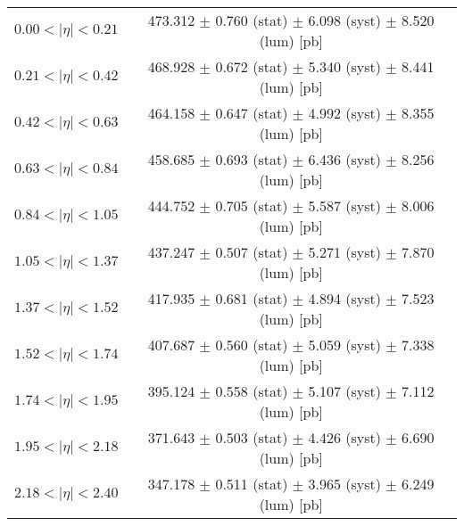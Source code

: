 \begin{tabular}{lc}
\hline
$0.00 < |\eta| <0.21$          & 473.312 $\pm$ 0.760 (stat) $\pm$ 6.098 (syst) $\pm$ 8.520 (lum) [pb]  \\
$0.21 < |\eta| <0.42$          & 468.928 $\pm$ 0.672 (stat) $\pm$ 5.340 (syst) $\pm$ 8.441 (lum) [pb]  \\
$0.42 < |\eta| <0.63$          & 464.158 $\pm$ 0.647 (stat) $\pm$ 4.992 (syst) $\pm$ 8.355 (lum) [pb]  \\
$0.63 < |\eta| <0.84$          & 458.685 $\pm$ 0.693 (stat) $\pm$ 6.436 (syst) $\pm$ 8.256 (lum) [pb]  \\
$0.84 < |\eta| <1.05$          & 444.752 $\pm$ 0.705 (stat) $\pm$ 5.587 (syst) $\pm$ 8.006 (lum) [pb]  \\
$1.05 < |\eta| <1.37$          & 437.247 $\pm$ 0.507 (stat) $\pm$ 5.271 (syst) $\pm$ 7.870 (lum) [pb]  \\
$1.37 < |\eta| <1.52$          & 417.935 $\pm$ 0.681 (stat) $\pm$ 4.894 (syst) $\pm$ 7.523 (lum) [pb]  \\
$1.52 < |\eta| <1.74$          & 407.687 $\pm$ 0.560 (stat) $\pm$ 5.059 (syst) $\pm$ 7.338 (lum) [pb]  \\
$1.74 < |\eta| <1.95$          & 395.124 $\pm$ 0.558 (stat) $\pm$ 5.107 (syst) $\pm$ 7.112 (lum) [pb]  \\
$1.95 < |\eta| <2.18$          & 371.643 $\pm$ 0.503 (stat) $\pm$ 4.426 (syst) $\pm$ 6.690 (lum) [pb]  \\
$2.18 < |\eta| <2.40$          & 347.178 $\pm$ 0.511 (stat) $\pm$ 3.965 (syst) $\pm$ 6.249 (lum) [pb]  \\
\hline
\end{tabular}
